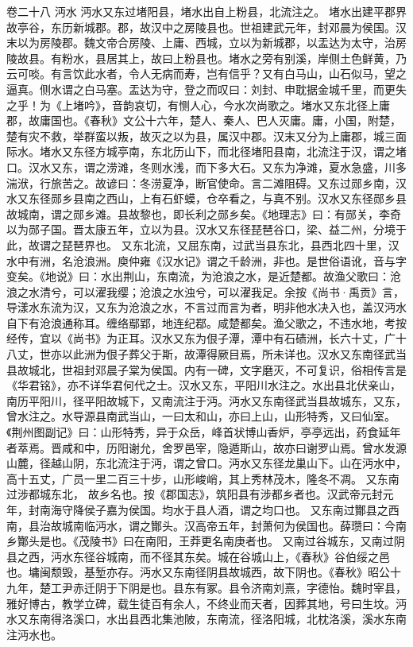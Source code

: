 \documentclass[12pt,UTF8]{ctexbook}
\begin{document}
卷二十八  沔水 
沔水又东过堵阳县，堵水出自上粉县，北流注之。
堵水出建平郡界故亭谷，东历新城郡。郡，故汉中之房陵县也。世祖建武元年，封邓晨为侯国。汉末以为房陵郡。魏文帝合房陵、上庸、西城，立以为新城郡，以盂达为太守，治房陵故县。有粉水，县居其上，故曰上粉县也。堵水之旁有别溪，岸侧土色鲜黄，乃云可啖。有言饮此水者，令人无病而寿，岂有信乎？又有白马山，山石似马，望之逼真。侧水谓之白马塞。盂达为守，登之而叹曰：刘封、申耽据金城千里，而更失之乎！为《上堵吟》，音韵哀切，有恻人心，今水次尚歌之。堵水又东北径上庸郡，故庸国也。《春秋》文公十六年，楚人、秦人、巴人灭庸。庸，小国，附楚，楚有灾不救，举群蛮以叛，故灭之以为县，属汉中郡。汉末又分为上庸郡，城三面际水。堵水又东径方城亭南，东北历山下，而北径堵阳县南，北流注于汉，谓之堵口。汉水又东，谓之涝滩，冬则水浅，而下多大石。又东为净滩，夏水急盛，川多湍洑，行旅苦之。故谚曰：冬涝夏净，断官使命。言二滩阻碍。又东过郧乡南，汉水又东径郧乡县南之西山，上有石虾蟆，仓卒看之，与真不别。汉水又东径郧乡县故城南，谓之郧乡滩。县故黎也，即长利之郧乡矣。《地理志》曰：有郧关，李奇以为郧子国。晋太康五年，立以为县。汉水又东径琵琶谷口，梁、益二州，分境于此，故谓之琵琶界也。
又东北流，又屈东南，过武当县东北，县西北四十里，汉水中有洲，名沧浪洲。庾仲雍《汉水记》谓之千龄洲，非也。是世俗语讹，音与字变矣。《地说》曰：水出荆山，东南流，为沧浪之水，是近楚都。故渔父歌曰：沧浪之水清兮，可以濯我缨；沧浪之水浊兮，可以濯我足。余按《尚书·禹贡》言，导漾水东流为汉，又东为沧浪之水，不言过而言为者，明非他水决入也，盖汉沔水自下有沧浪通称耳。缠络鄢郢，地连纪鄀。咸楚都矣。渔父歌之，不违水地，考按经传，宜以《尚书》为正耳。汉水又东为佷子潭，潭中有石碛洲，长六十丈，广十八丈，世亦以此洲为佷子葬父于斯，故潭得厥目焉，所未详也。汉水又东南径武当县故城北，世祖封邓晨子棠为侯国。内有一碑，文字磨灭，不可复识，俗相传言是《华君铭》，亦不详华君何代之士。汉水又东，平阳川水注之。水出县北伏亲山，南历平阳川，径平阳故城下，又南流注于沔。沔水又东南径武当县故城东，又东，曾水注之。水导源县南武当山，一曰太和山，亦曰上山，山形特秀，又曰仙室。《荆州图副记》曰：山形特秀，异于众岳，峰首状博山香炉，亭亭远出，药食延年者萃焉。晋咸和中，历阳谢允，舍罗邑宰，隐遁斯山，故亦曰谢罗山焉。曾水发源山麓，径越山阴，东北流注于沔，谓之曾口。沔水又东径龙巢山下。山在沔水中，高十五丈，广员一里二百三十步，山形峻峭，其上秀林茂木，隆冬不凋。
又东南过涉都城东北， 故乡名也。按《郡国志》，筑阳县有涉都乡者也。汉武帝元封元年，封南海守降侯子嘉为侯国。均水于县人酒，谓之均口也。
又东南过酇县之西南，县治故城南临沔水，谓之酇头。汉高帝五年，封萧何为侯国也。薛瓒曰：今南乡酇头是也。《茂陵书》曰在南阳，王莽更名南庚者也。
又南过谷城东，又南过阴县之西，沔水东径谷城南，而不径其东矣。城在谷城山上，《春秋》谷伯绥之邑也。墉闽颓毁，基堑亦存。沔水又东南径阴县故城西，故下阴也。《春秋》昭公十九年，楚工尹赤迁阴于下阴是也。县东有冢。县令济南刘熹，字德怡。魏时宰县，雅好博古，教学立碑，载生徒百有余人，不终业而天者，因葬其地，号曰生坟。沔水又东南得洛溪口，水出县西北集池陂，东南流，径洛阳城，北枕洛溪，溪水东南注沔水也。
\end{document}
